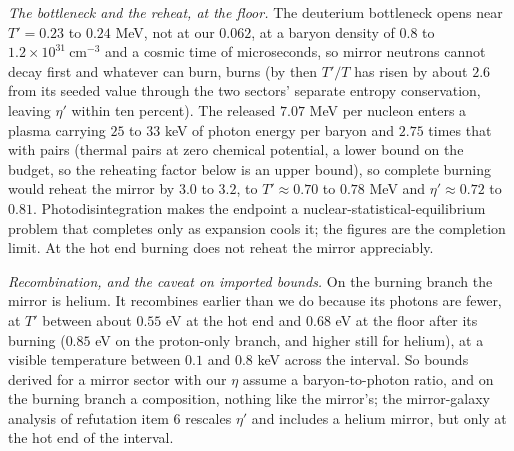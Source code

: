 \documentclass[11pt]{article}
\theoremstyle{definition}
\begin{document}
\smallskip\noindent\emph{The bottleneck and the reheat, at the floor.} The deuterium bottleneck opens near $T' = 0.23$ to $0.24$ MeV, not at our $0.062$, at a baryon density of $0.8$ to $1.2 \times 10^{31}\ \mathrm{cm^{-3}}$ and a cosmic time of microseconds, so mirror neutrons cannot decay first and whatever can burn, burns (by then $T'/T$ has risen by about $2.6$ from its seeded value through the two sectors' separate entropy conservation, leaving $\eta'$ within ten percent). The released $7.07$ MeV per nucleon enters a plasma carrying $25$ to $33$ keV of photon energy per baryon and $2.75$ times that with pairs (thermal pairs at zero chemical potential, a lower bound on the budget, so the reheating factor below is an upper bound), so complete burning would reheat the mirror by $3.0$ to $3.2$, to $T' \approx 0.70$ to $0.78$ MeV and $\eta' \approx 0.72$ to $0.81$. Photodisintegration makes the endpoint a nuclear-statistical-equilibrium problem that completes only as expansion cools it; the figures are the completion limit. At the hot end burning does not reheat the mirror appreciably.

\smallskip\noindent\emph{Recombination, and the caveat on imported bounds.} On the burning branch the mirror is helium. It recombines earlier than we do because its photons are fewer, at $T'$ between about $0.55$ eV at the hot end and $0.68$ eV at the floor after its burning ($0.85$ eV on the proton-only branch, and higher still for helium), at a visible temperature between $0.1$ and $0.8$ keV across the interval. So bounds derived for a mirror sector with our $\eta$ assume a baryon-to-photon ratio, and on the burning branch a composition, nothing like the mirror's; the mirror-galaxy analysis of refutation item 6 rescales $\eta'$ and includes a helium mirror, but only at the hot end of the interval.
\end{document}
